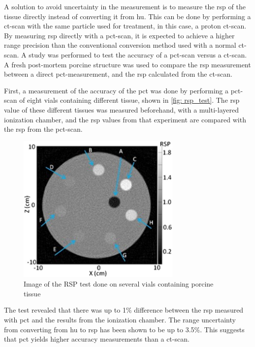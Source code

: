 \documentclass[main.tex]{subfiles}
\begin{document}
A solution to avoid uncertainty in the measurement is to measure the \gls{rsp} of the tissue directly instead of converting it from \gls{hu}. This can be done by performing a \gls{ct}-scan with the same particle used for treatment, in this case, a proton \gls{ct}-scan. By measuring \gls{rsp} directly with a \gls{pct}-scan, it is expected to achieve a higher range precision than the conventional conversion method used with a normal \gls{ct}-scan. A study was performed to test the accuracy of a \gls{pct}-scan versus a \gls{ct}-scan. A fresh post-mortem porcine structure was used to compare the \gls{rsp} measurement between a direct \gls{pct}-measurement, and the \gls{rsp} calculated from the \gls{ct}-scan\cite{porcine_2021}.

First, a measurement of the accuracy of the \gls{pct} was done by performing a \gls{pct}-scan of eight vials containing different tissue, shown in \autoref{fig: rsp_test}. The \gls{rsp} value of these different tissues was measured beforehand, with a multi-layered ionization chamber, and the \gls{rsp} values from that experiment are compared with the \gls{rsp} from the \gls{pct}-scan.

\begin{figure}[!htpb]
    \centering
    \includegraphics[width=8cm ]{images/porcine_phantom.jpg}
    \caption{Image of the RSP test done on several vials containing porcine tissue\cite{porcine_2021}}
    \label{fig: rsp_test}
\end{figure}
\FloatBarrier

The test revealed that there was up to 1\% difference between the \gls{rsp} measured with \gls{pct} and the results from the ionization chamber. The range uncertainty from converting from \gls{hu} to \gls{rsp} has been shown to be up to 3.5\%\cite{Paganetti_2012}. This suggests that \gls{pct} yields higher accuracy measurements than a \gls{ct}-scan. 
\end{document}
